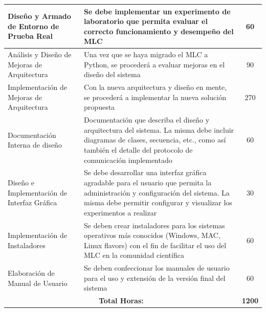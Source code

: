 \documentclass[a4paper,10pt]{article}
\begin{document}
\begin{center}
\begin{longtable}{|p{3.5cm}|p{7cm}|c|}
            Diseño y Armado de Entorno de Prueba Real & Se debe implementar un experimento de laboratorio que permita evaluar el correcto
            funcionamiento y desempeño del MLC & 60 \\
            \hline
            Análisis y Diseño de Mejoras de Arquitectura & Una vez que se haya migrado el MLC a Python, se procederá a evaluar
            mejoras en el diseño del sistema & 90 \\
            \hline
            Implementación de Mejoras de Arquitectura & Con la nueva arquitectura y diseño en mente, se procederá a implementar
            la nueva solución propuesta & 270 \\
            \hline
            Documentación Interna de diseño & Documentación que describa el diseño y arquitectura del sistema. La misma debe incluir
            diagramas de clases, secuencia, etc., como así también el detalle del protocolo de comunicación implementado & 60 \\
            \hline
            Diseño e Implementación de Interfaz Gráfica & Se debe desarrollar una interfaz gráfica agradable para el usuario que permita
            la administración y configuración del sistema. La misma debe permitir configurar y visualizar los experimentos a realizar
            & 30 \\
            \hline
            Implementación de Instaladores & Se deben crear instaladores para los sistemas operativos más conocidos
            (Windows, MAC, Linux flavors) con el fin de facilitar el uso del MLC en la comunidad científica & 60 \\
            \hline
            Elaboración de Manual de Usuario & Se deben confeccionar los manuales de usuario para el uso y extensión de la versión final
            del sistema & 60 \\
            \hline
            \multicolumn{2}{|c|}{\textbf{Total Horas:}} & \textbf{1200} \\
            \hline
        \end{longtable}
        \end{center}

    \newpage
     
    
\end{document}
